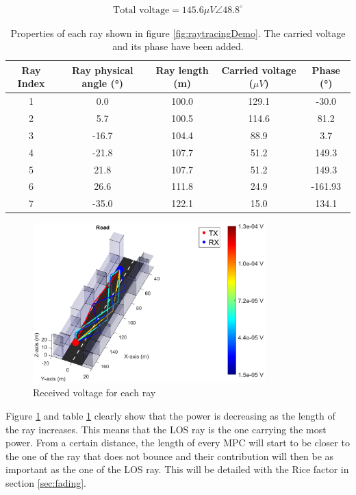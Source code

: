 \documentclass[10pt,a4paper]{ULBreport}
\begin{document}
\begin{align*}
    \text{Total voltage} = 145.6 \mu V \angle 48.8^\circ
\end{align*}

\begin{table}[H]
    \centering
    \begin{tabular}{|c|c|c|c|c|}
        \hline
        Ray Index & Ray physical angle (°) & Ray length (m) & Carried voltage ($\mu V$) & Phase (°) \\ \hline
        1 & 0.0 & 100.0 & 129.1 & -30.0\\ \hline
        2 & 5.7 & 100.5 & 114.6 & 81.2\\ \hline
        3 & -16.7 & 104.4 & 88.9 & 3.7\\ \hline
        4 & -21.8 & 107.7 & 51.2 & 149.3\\ \hline
        5 & 21.8 & 107.7 & 51.2 & 149.3\\ \hline
        6 & 26.6 & 111.8 & 24.9 & -161.93\\ \hline
        7 & -35.0 & 122.1 & 15.0 & 134.1\\ \hline
    \end{tabular}
    \caption{Properties of each ray shown in figure \ref{fig:raytracingDemo}. The carried voltage and its phase have been added.}
    \label{tab:ray_properties}
\end{table}

\begin{figure}
    \centering
    \includegraphics[width=0.8\textwidth]{3_2.eps}
    \caption{Received voltage for each ray}
    \label{fig:voltageDemo}
\end{figure}

Figure \ref{fig:voltageDemo} and table \ref{tab:ray_properties} clearly show that the power is decreasing as the length of the ray increases. This means that the LOS ray is the one carrying the most power. From a certain distance, the length of every MPC will start to be closer to the one of the ray that does not bounce and their contribution will then be as important as the one of the LOS ray. This will be detailed with the Rice factor in section \ref{sec:fading}.
\end{document}
